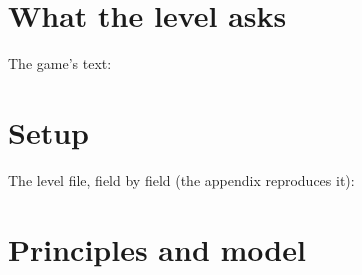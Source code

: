 \documentclass{leveldoc}
\begin{document}
\section{What the level asks}\label{sec:asks}

The game's text:
\leveldescription


\section{Setup}\label{sec:setup}

The level file, field by field (the appendix reproduces it):
\setuptable


\section{Principles and model}\label{sec:model}

\begin{principles}
  \item
\end{principles}

\end{document}
